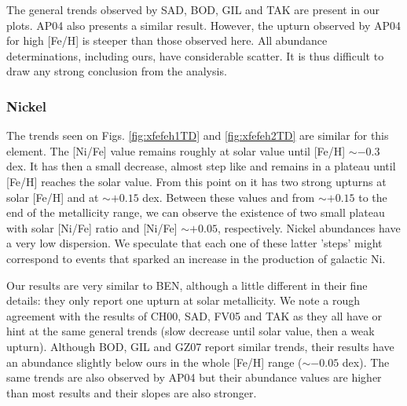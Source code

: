 \documentclass[oldversion]{aa}
\begin{document}
The general trends observed by SAD, BOD, GIL and TAK are present in our plots. AP04 also presents a similar result. However, the upturn observed by AP04 for high [Fe/H] is steeper than those observed here. All abundance determinations, including ours, have considerable scatter. It is thus difficult to draw any strong conclusion from the analysis.



\subsubsection{Nickel}


The trends seen on Figs. \ref{fig:xfefeh1TD} and \ref{fig:xfefeh2TD} are similar for this element. The [Ni/Fe] value remains roughly at solar value until [Fe/H] $\sim -0.3$ dex. It has then a small decrease, almost step like and remains in a plateau until [Fe/H] reaches the solar value. From this point on it has two strong upturns at solar [Fe/H] and at $\sim +0.15$ dex. Between these values and from $\sim +0.15$ to the end of the metallicity range, we can observe the existence of two small plateau with solar [Ni/Fe] ratio and [Ni/Fe] $\sim +0.05$, respectively. %
Nickel abundances have a very low dispersion. We speculate that each one of these latter 'steps' might correspond to events that sparked an increase in the production of galactic Ni.

Our results are very similar to BEN, although a little different in their fine details: they only report one upturn at solar metallicity. We note a rough agreement with the results of CH00, SAD, FV05 and TAK as they all have or hint at the same general trends (slow decrease until solar value, then a weak upturn). Although BOD, GIL and GZ07 report similar trends, their results have an abundance slightly below ours in the whole [Fe/H] range ($\sim -0.05$ dex). The same trends are also observed by AP04 but their abundance values are higher than most results and their slopes are also stronger. 
\end{document}
